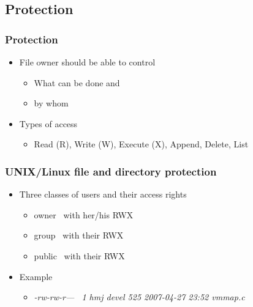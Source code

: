 \documentclass[CJKutf8,xcolor=pdftex,dvipsnames,table]{beamer}
\begin{document}
\begin{CJK*}{UTF8}{song}
  \subsection{Protection}

  \begin{frame}
    \frametitle{Protection} \pause
    \begin{itemize}\parskip=0pt
    \item File owner should be able to control \pause
      \begin{itemize}\parskip=0pt
      \item What can be done and \pause
      \item by whom \pause
      \end{itemize}
    \item Types of access \pause
      \begin{itemize}\parskip=0pt
      \item Read (R), Write (W), Execute (X), Append, Delete, List
      \end{itemize}
    \end{itemize}
  \end{frame}

  \begin{frame}
    \frametitle{UNIX/Linux file and directory protection} \pause
    \begin{itemize}
    \item Three classes of users and their access rights
      \begin{itemize}\parskip=0pt
      \item \color{red}owner\color{black} \  with  her/his  RWX \pause
      \item \color{blue}group\color{black} \  with  their    RWX \pause
      \item \color{green}public\color{black} \  with  their    RWX \pause
      \end{itemize}
    \item Example \pause
      \begin{itemize}
      \item \emph{-\color{red}rw-\color{blue}rw-\color{green}r---\color{black} \  1 \color{red}hmj\color{black} \color{blue}devel\color{black} 525 2007-04-27 23:52 vmmap.c}
      \end{itemize}
    \end{itemize}
  \end{frame}


\end{CJK*}
\end{document}
